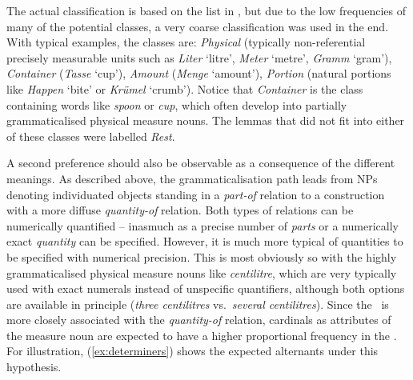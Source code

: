 The actual classification is based on the list in \citet[530]{Koptjevskaja2001}, but due to the low frequencies of many of the potential classes, a very coarse classification was used in the end.
With typical examples, the classes are:
\textit{Physical} (typically non-referential precisely measurable units such as \textit{Liter} `litre', \textit{Meter} `metre', \textit{Gramm} `gram'),
\textit{Container} (\textit{Tasse} `cup'),
\textit{Amount} (\textit{Menge} `amount'), 
\textit{Portion} (natural portions like \textit{Happen} `bite' or \textit{Krümel} `crumb').
Notice that \textit{Container} is the class containing words like \textit{spoon} or \textit{cup}, which often develop into partially grammaticalised physical measure nouns.
The lemmas that did not fit into either of these classes were labelled \textit{Rest}.


A second preference should also be observable as a consequence of the different meanings.
As described above, the grammaticalisation path leads from NPs denoting individuated objects standing in a \textit{part-of} relation to a construction with a more diffuse \textit{quantity-of} relation.
Both types of relations can be numerically quantified -- inasmuch as a precise number of \textit{parts} or a numerically exact \textit{quantity} can be specified.
However, it is much more typical of quantities to be specified with numerical precision.
This is most obviously so with the highly grammaticalised physical measure nouns like \textit{centilitre}, which are very typically used with exact numerals instead of unspecific quantifiers, although both options are available in principle (\textit{three centilitres} vs.\ \textit{several centilitres}).
Since the \NACa\ is more closely associated with the \textit{quantity-of} relation, cardinals as attributes of the measure noun are expected to have a higher proportional frequency in the \NACa.
For illustration, (\ref{ex:determiners}) shows the expected alternants under this hypothesis.

\begin{exe}
  \ex\label{ex:determiners} 
  \begin{xlist}
  \end{xlist}
\end{exe}

